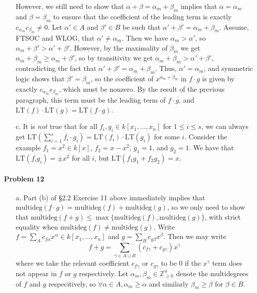 \documentclass[12pt]{amsart}
\theoremstyle{definition}
\begin{document}
\begin{flushleft}
\begin{enumerate}
    However, we still need to show that $\alpha + \beta = \alpha_m + \beta_m$ implies that $\alpha = \alpha_m$ and $\beta = \beta_m$ to ensure that the coefficient of the leading term is exactly $c_{\alpha_m} c_{\beta_m} \ne 0$. Let $\alpha'\in A$ and $\beta' \in B$ be such that $\alpha' + \beta' = \alpha_m + \beta_m$. Assume, FTSOC and WLOG, that $\alpha' \ne \alpha_m$. 
    Then we have $\alpha_m > \alpha'$, so $\alpha_m + \beta' > \alpha'+\beta'$. However, by the maximality of $\beta_m$ we get $\alpha_m + \beta_m \ge \alpha_m + \beta'$, so by transitivity we get $\alpha_m + \beta_m>\alpha' + \beta'$, contradicting the fact that $\alpha' + \beta' = \alpha_m + \beta_m$. 
    Thus, $\alpha' = \alpha_m$, and symmetric logic shows that $\beta' = \beta_m$, so the coefficient of $x^{\alpha_m + \beta_m}$ in $f\cdot g$ is given by exactly $c_{\alpha_m} c_{\beta_m}$, which must be nonzero. By the result of the previous paragraph, this term must be the leading term of $f \cdot g$, and $\text{LT}(f)\cdot \text{LT}(g) = \text{LT}(f\cdot g)$.
    \item[c.] It is \emph{not} true that for all $f_i,g_i \in k[x_1,\dots,x_n]$ for $1\le i \le s$, we can always get $\text{LT}\left(\sum_{i=1}^s f_i\cdot g_i\right) = \text{LT}(f_i)\cdot \text{LT}(g_i)$ for some $i$. Consider the example $f_1 = x^2 \in k[x]$, $f_2 = x-x^2$, $g_1 = 1$, and $g_2 = 1$. We have that $\text{LT}(f_ig_i) = \pm x^2$ for all $i$, but $\text{LT}(f_1g_1+f_2g_2) = x$.
\end{enumerate}

\paragraph{Problem 12} \begin{enumerate}
    \item[a.] Part (b) of \S2.2 Exercise 11 above immediately implies that $\text{multideg}(f\cdot g) = \text{multideg}(f) + \text{multideg}(g)$, so we only need to show that $\text{multideg}(f+g) \le \max\{\text{multideg}(f),\text{multideg}(g)\}$, with strict equality when $\text{multideg}(f)\ne\text{multideg}(g)$. Write $f = \sum_A c_{f\alpha} x^\alpha \in k[x_1,\dots,x_n]$ and $g = \sum_B c_{g\beta}x^\beta$. Then we may write \[
    f+g = \sum_{\gamma \in A \cup B} (c_{f\gamma} + c_{g\gamma}) x^\gamma
    \]
    where we take the relevant coefficient $c_{f\gamma}$ or $c_{g\gamma}$ to be $0$ if the $x^\gamma$ term does not appear in $f$ or $g$ respectively. Let $\alpha_m, \beta_m \in \mathbb Z^n_{\ge0}$ denote the multidegrees of $f$ and $g$ respecitively, so $\forall \alpha \in A, \alpha_m \ge \alpha$ and similarly $\beta_m \ge \beta$ for $\beta \in B$. 
    

\end{enumerate}
\end{flushleft}
\end{document}
